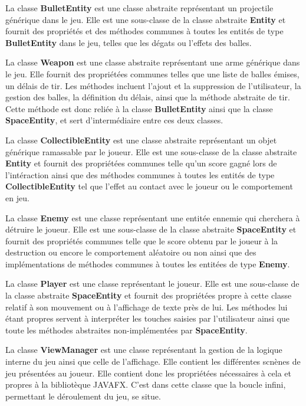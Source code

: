 \documentclass[12pt]{article}
\begin{document}
{La classe \textbf{BulletEntity} est une classe abstraite représentant un projectile générique dans le jeu. Elle est une sous-classe de la classe abstraite \textbf{Entity} et fournit des propriétés et des méthodes communes à toutes les entités de type \textbf{BulletEntity} dans le jeu, telles que les dégats ou l'effets des balles.\newline


La classe \textbf{Weapon} est une classe abstraite représentant une arme générique dans le jeu. Elle fournit des propriétées communes telles que une liste de balles émises, un délais de tir. Les méthodes incluent l'ajout et la suppression de l'utilisateur, la gestion des balles, la définition du délais, ainsi que la méthode abstraite de tir. Cette méthode est donc reliée à la classe \textbf{BulletEntity} ainsi que la classe \textbf{SpaceEntity}, et sert d'intermédiaire entre ces deux classes.\newline


La classe \textbf{CollectibleEntity} est une classe abstraite représentant un objet générique ramassable par le joueur.  Elle est une sous-classe de la classe abstraite \textbf{Entity} et fournit des propriétées communes telle qu'un score gagné lors de l'intéraction ainsi que des méthodes communes à toutes les entités de type \textbf{CollectibleEntity} tel que l'effet au contact avec le joueur ou le comportement en jeu.\newline


La classe \textbf{Enemy} est une classe représentant une entitée ennemie qui cherchera à détruire le joueur. Elle est une sous-classe de la classe abstraite \textbf{SpaceEntity} et fournit des propriétés communes telle que le score obtenu par le joueur à la destruction ou encore le comportement aléatoire ou non ainsi que des implémentations de méthodes communes à toutes les entitées de type \textbf{Enemy}.\newline


La classe \textbf{Player} est une classe représentant le joueur. Elle est une sous-classe de la classe abstraite \textbf{SpaceEntity} et fournit des propriétées propre à cette classe relatif à son mouvement ou à l'affichage de texte près de lui. Les méthodes lui étant propres servent à interpréter les touches saisies par l'utilisateur ainsi que toute les méthodes abstraites non-implémentées par \textbf{SpaceEntity}.\newline


La classe \textbf{ViewManager} est une classe représentant la gestion de la logique interne du jeu ainsi que celle de l'affichage. Elle contient les différentes scnènes de jeu présentées au joueur.
Elle contient donc les propriétées nécessaires à cela et propres à la bibliotèque JAVAFX. C'est dans cette classe que la boucle infini, permettant le déroulement du jeu, se situe.\newline


}
\end{document}
